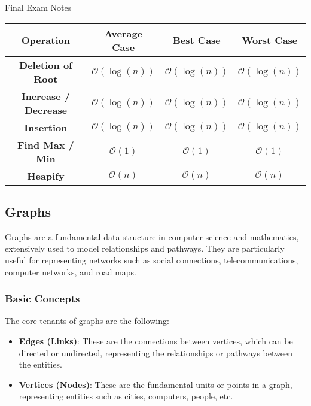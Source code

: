 \begin{examnotes}{Final Exam Notes}
    \begin{center}
        \begin{tabular}[ht]{|c|c|c|c|}
            \hline \textbf{Operation} & \textbf{Average Case} & \textbf{Best Case} & \textbf{Worst Case} \\ \hline
            \textbf{Deletion of Root} & $\mathcal{O}(\log{(n)})$ & $\mathcal{O}(\log{(n)})$ & $\mathcal{O}(\log{(n)})$ \\ \hline
            \textbf{Increase / Decrease} & $\mathcal{O}(\log{(n)})$ & $\mathcal{O}(\log{(n)})$ & $\mathcal{O}(\log{(n)})$ \\ \hline
            \textbf{Insertion} & $\mathcal{O}(\log{(n)})$ & $\mathcal{O}(\log{(n)})$ & $\mathcal{O}(\log{(n)})$ \\ \hline
            \textbf{Find Max / Min} & $\mathcal{O}(1)$ & $\mathcal{O}(1)$ & $\mathcal{O}(1)$ \\ \hline
            \textbf{Heapify} & $\mathcal{O}(n)$ & $\mathcal{O}(n)$ & $\mathcal{O}(n)$ \\ \hline
        \end{tabular}
    \end{center}

    \subsection*{Graphs}

    Graphs are a fundamental data structure in computer science and mathematics, extensively used to model relationships and pathways. They are particularly useful for representing networks such as 
    social connections, telecommunications, computer networks, and road maps.

    \subsubsection*{Basic Concepts}

    The core tenants of graphs are the following:

    \begin{itemize}
        \item \textbf{Edges (Links)}: These are the connections between vertices, which can be directed or undirected, representing the relationships or pathways between the entities.
        \item \textbf{Vertices (Nodes)}: These are the fundamental units or points in a graph, representing entities such as cities, computers, people, etc.
    \end{itemize}


\end{examnotes}
